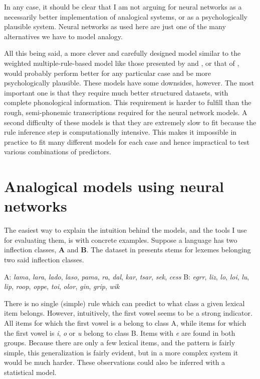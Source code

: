 In any case, it should be clear that I am not arguing for neural networks as a necessarily better implementation of analogical systems, or as a psychologically plausible system. Neural networks as used here are just one of the many alternatives we have to model analogy.

All this being said, a more clever and carefully designed model similar to the weighted multiple-rule-based model like those presented by \textcite{Albright.2003} and \textcite{Albright.2009}, or that of \textcite{Beniamine.2016}, would probably perform better for any particular case and be more psychologically plausible. These models have some downsides, however. The most important one is that they require much better structured datasets, with complete phonological information. This requirement is harder to fulfill than the rough, semi-phonemic transcriptions required for the neural network models. A second difficulty of these models is that they are extremely slow to fit because the rule inference step is computationally intensive. This makes it impossible in practice to fit many different models for each case and hence impractical to test various combinations of predictors.

\section{Analogical models using neural networks}

The easiest way to explain the intuition behind the models, and the tools I use for evaluating them, is with concrete examples. Suppose a language has two inflection classes, \textbf{A} and \textbf{B}. The dataset in  presents stems for lexemes belonging two said inflection classes.

\begin{exe}
    \ex  \label{exe-inflect-1}
    \begin{xlist}
        \ex A: \textit{lama}, \textit{lara}, \textit{lado}, \textit{laso}, \textit{pama}, \textit{ra}, \textit{dal}, \textit{kar}, \textit{tsar}, \textit{sek}, \textit{cess}
        \ex B: \textit{egrr}, \textit{liz}, \textit{lo}, \textit{loi}, \textit{lu}, \textit{lip}, \textit{roop}, \textit{oppe}, \textit{toi}, \textit{olor}, \textit{gin}, \textit{grip}, \textit{wik}
    \end{xlist}
\end{exe}

There is no single (simple) rule which can predict to what class a given lexical item belongs. However, intuitively, the first vowel seems to be a strong indicator. All items for which the first vowel is \textit{a} belong to class A, while items for which the first vowel is \textit{i}, \textit{o} or \textit{u} belong to class B. Items with \textit{e} are found in both groups. Because there are only a few lexical items, and the pattern is fairly simple, this generalization is fairly evident, but in a more complex system it would be much harder. These observations could also be inferred with a statistical model.

